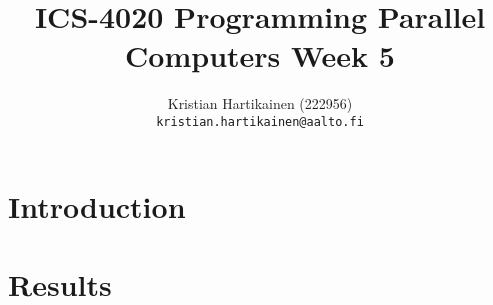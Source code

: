 \documentclass[a4paper,10pt]{article}
\title{ICS-4020 Programming Parallel Computers Week 5}
\author{Kristian Hartikainen (222956)\\
       {\tt kristian.hartikainen@aalto.fi}}
\begin{document}
\maketitle

\section{Introduction}


\pagebreak
\section{Results}

\end{document}
